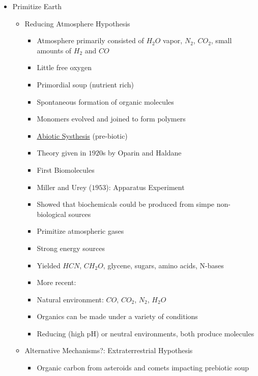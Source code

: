 \documentclass[12pt]{article}
\begin{document}
\begin{itemize}
\begin{itemize}
            \item Primitize Earth
            \begin{itemize}
                \item Reducing Atmosphere Hypothesis
                \begin{itemize}
                    \item Atmosphere primarily consisted of $H_2O$ vapor, $N_2$, $CO_2$, small amounts of $H_2$ and $CO$
                    \item Little free oxygen
                    \item Primordial soup (nutrient rich)
                    \item Spontaneous formation of organic molecules
                    \item Monomers evolved and joined to form polymers
                    \item \underline{Abiotic Systhesis} (pre-biotic)
                    \item Theory given in $1920$s by Oparin and Haldane
                    \item First Biomolecules
                    \item Miller and Urey ($1953$): Apparatus Experiment
                    \item Showed that biochemicals could be produced from simpe non-biological sources
                    \item Primitize atmospheric gases
                    \item Strong energy sources
                    \item Yielded $HCN$, $CH_2O$, glycene, sugars, amino acids, N-bases
                    \item More recent:
                    \item Natural environment: $CO$, $CO_2$, $N_2$, $H_2O$
                    \item Organics can be made under a variety of conditions
                    \item Reducing (high pH) or neutral environments, both produce molecules
                \end{itemize}
                \item Alternative Mechanisms?: Extraterrestrial Hypothesis                        
                \begin{itemize}
                    \item Organic carbon from asteroids and comets impacting prebiotic soup

\end{itemize}
\end{itemize}
\end{itemize}
\end{itemize}
\end{document}
